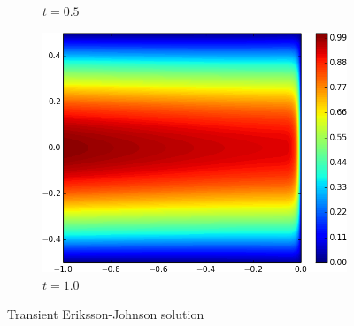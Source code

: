 \documentclass{article}
\theoremstyle{definition}
\theoremstyle{remark}
\begin{document}
\begin{figure}[ht]
\begin{subfigure}[t]{0.32\textwidth}
\caption{$t=0.5$}
\end{subfigure}
\begin{subfigure}[t]{0.32\textwidth}
\centering
\includegraphics[width=\textwidth]{Confusion/Robustness/2d_problem_t_=_10.png}
\caption{$t=1.0$}
\end{subfigure}
\caption{Transient Eriksson-Johnson solution}
\label{fig:transientAnalytical}
\end{figure}

\end{document}
